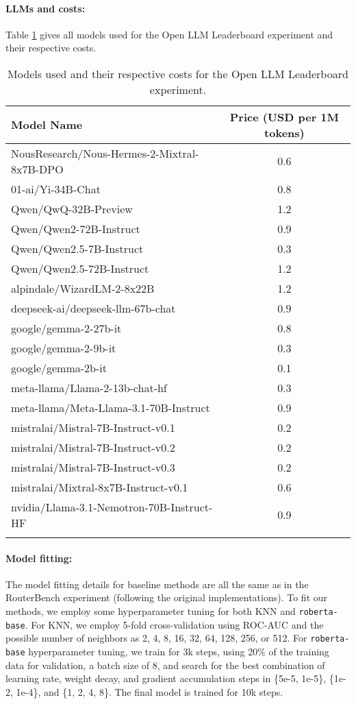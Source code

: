 \paragraph{LLMs and costs:} Table \ref{tab:llms_open} gives all models used for the Open LLM Leaderboard experiment and their respective costs.
\begin{longtable}{lc}
\hline
\textbf{Model Name} & \textbf{Price (USD per 1M tokens)} \\ \hline
NousResearch/Nous-Hermes-2-Mixtral-8x7B-DPO & 0.6 \\ \hline
01-ai/Yi-34B-Chat & 0.8 \\ \hline
Qwen/QwQ-32B-Preview & 1.2 \\ \hline
Qwen/Qwen2-72B-Instruct & 0.9 \\ \hline
Qwen/Qwen2.5-7B-Instruct & 0.3 \\ \hline
Qwen/Qwen2.5-72B-Instruct & 1.2 \\ \hline
alpindale/WizardLM-2-8x22B & 1.2 \\ \hline
deepseek-ai/deepseek-llm-67b-chat & 0.9 \\ \hline
google/gemma-2-27b-it & 0.8 \\ \hline
google/gemma-2-9b-it & 0.3 \\ \hline
google/gemma-2b-it & 0.1 \\ \hline
meta-llama/Llama-2-13b-chat-hf & 0.3 \\ \hline
meta-llama/Meta-Llama-3.1-70B-Instruct & 0.9 \\ \hline
mistralai/Mistral-7B-Instruct-v0.1 & 0.2 \\ \hline
mistralai/Mistral-7B-Instruct-v0.2 & 0.2 \\ \hline
mistralai/Mistral-7B-Instruct-v0.3 & 0.2 \\ \hline
mistralai/Mixtral-8x7B-Instruct-v0.1 & 0.6 \\ \hline
nvidia/Llama-3.1-Nemotron-70B-Instruct-HF & 0.9 \\ \hline
\caption{Models used and their respective costs for the Open LLM Leaderboard experiment.}
\label{tab:llms_open}
\end{longtable}

\paragraph{Model fitting:} The model fitting details for baseline methods are all the same as in the RouterBench experiment (following the original implementations). To fit our methods, we employ some hyperparameter tuning for both KNN and \texttt{roberta-base}. For KNN, we employ 5-fold cross-validation using ROC-AUC and the possible number of neighbors as 2, 4, 8, 16, 32, 64, 128, 256, or 512. For \texttt{roberta-base} hyperparameter tuning, we train for 3k steps, using 20\% of the training data for validation, a batch size of 8, and search for the best combination of learning rate, weight decay, and gradient accumulation steps in \{5e-5, 1e-5\}, \{1e-2, 1e-4\}, and \{1, 2, 4, 8\}. The final model is trained for 10k steps.

